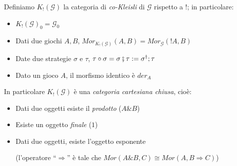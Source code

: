 \documentclass{beamer}
\begin{document}
\begin{frame}[t]
\end{frame}





 
\begin{frame}

Definiamo $K_!(\mathcal{G})$ la categoria di \emph{co-Kleisli} di $\mathcal{G}$ rispetto a $!$; in particolare:
	
	\begin{itemize}
		\item $K_!(\mathcal{G})_0 = \mathcal{G}_0$
		\item Dati due giochi $A,B$, $Mor_{K_!(\mathcal{G})}(A,B) = Mor_{\mathcal{G}}(!A,B)$
		\item Date due strategie $\sigma$ e $\tau$, $\tau \circ \sigma = \sigma \fatsemi \tau := \sigma ^\dag ; \tau$
		\item Dato un gioco $A$, il morfismo identico è $der_A$
	\end{itemize}

	In particolare $K_!(\mathcal{G})$ è una \emph{categoria cartesiana chiusa}, cioè:
	\begin{itemize}
		\item Dati due oggetti esiste il \emph{prodotto} ($A\& B$)
		\item Esiste un oggetto \emph{finale} ($1$)
		\item Dati due oggetti, esiste l'oggetto esponente 
		
		(l'operatore ``$\Rightarrow$'' è tale che $Mor(A\& B,C) \cong Mor(A,B\Rightarrow C)$)
	\end{itemize}

\end{frame}
\end{document}
